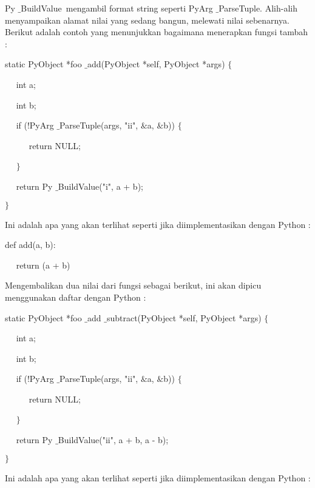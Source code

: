 \documentclass[a4paper,12pt]{report}
\begin{document}
\vspace{12pt}
\vspace{14pt}
Py $  \_  $BuildValue~mengambil format string seperti PyArg $  \_  $ParseTuple. Alih-alih menyampaikan alamat nilai yang sedang  bangun, melewati nilai sebenarnya. Berikut adalah contoh yang menunjukkan bagaimana menerapkan fungsi tambah : \par
\noindent 
static PyObject *foo $  \_  $add(PyObject *self, PyObject *args)  $  \{  $ \par
\noindent 
~~ int a; \par
\noindent 
~~ int b; \par
\vspace{12pt}
\noindent 
~~ if (!PyArg $  \_  $ParseTuple(args, "ii",  $  \&  $a,  $  \&  $b))  $  \{  $ \par
\noindent 
~~~~~ return NULL; \par
\noindent 
~~  $  \}  $ \par
\noindent 
~~ return Py $  \_  $BuildValue("i", a + b); \par
\noindent 
 $  \}  $ \par
\vspace{14pt}
Ini adalah apa yang akan terlihat seperti jika diimplementasikan dengan Python : \par
\noindent 
def add(a, b): \par
\noindent 
~~ return (a + b) \par
\vspace{16pt}
Mengembalikan dua nilai dari fungsi sebagai berikut, ini akan dipicu menggunakan daftar dengan Python : \par
\noindent 
static PyObject *foo $  \_  $add $  \_  $subtract(PyObject *self, PyObject *args)  $  \{  $ \par
\noindent 
~~ int a; \par
\noindent 
~~ int b; \par
\vspace{12pt}
\noindent 
~~ if (!PyArg $  \_  $ParseTuple(args, "ii",  $  \&  $a,  $  \&  $b))  $  \{  $ \par
\noindent 
~~~~~ return NULL; \par
\noindent 
~~  $  \}  $ \par
\noindent 
~~ return Py $  \_  $BuildValue("ii", a + b, a - b); \par
\noindent 
 $  \}  $ \par
\vspace{16pt}
Ini adalah apa yang akan terlihat seperti jika diimplementasikan dengan Python : \par
\end{document}
